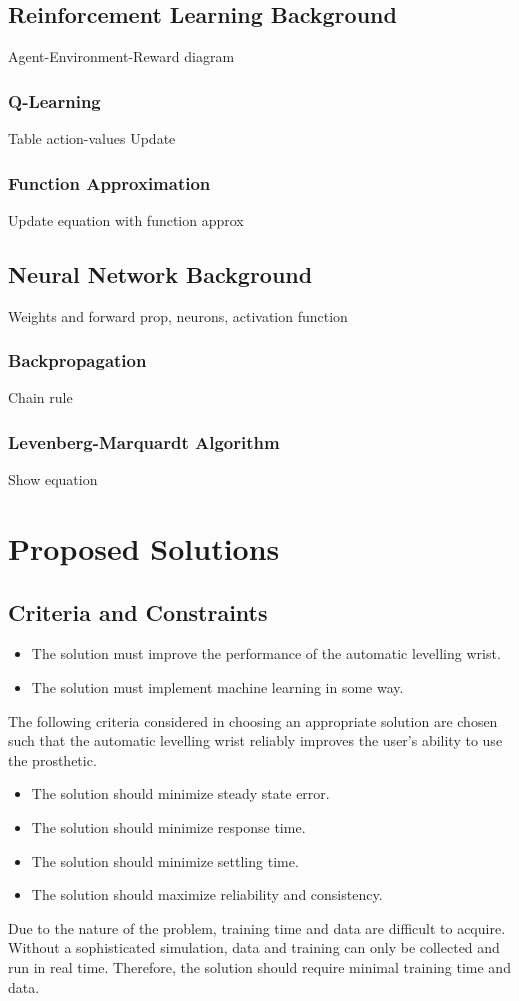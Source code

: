 \documentclass[letterpaper,12pt]{article}
\begin{document}
\subsection{Reinforcement Learning Background}
Agent-Environment-Reward diagram
\subsubsection{Q-Learning}
Table action-values
Update
\subsubsection{Function Approximation}
Update equation with function approx

\subsection{Neural Network Background}
Weights and forward prop, neurons, activation function
\subsubsection{Backpropagation}
Chain rule
\subsubsection{Levenberg-Marquardt Algorithm}
Show equation



\section{Proposed Solutions}
\subsection{Criteria and Constraints}
\begin{itemize}
		\item The solution must improve the performance of the automatic levelling wrist.
    \item The solution must implement machine learning in some way.

\end{itemize}

The following criteria considered in choosing an appropriate solution are chosen such that the automatic levelling wrist reliably improves the user's ability to use the prosthetic.
\begin{itemize}
    \item The solution should minimize steady state error.
		\item The solution should minimize response time.
		\item The solution should minimize settling time.
		\item The solution should maximize reliability and consistency.
\end{itemize}
Due to the nature of the problem, training time and data are difficult to acquire. Without a sophisticated simulation, data and training can only be collected and run in real time. Therefore, the solution should require minimal training time and data.
\end{document}
